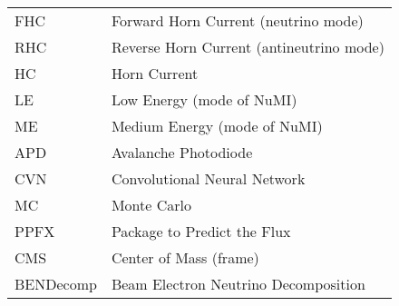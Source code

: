 \documentclass[12pt,a4paper]{report}
\let\openright=\clearpage
\begin{document}
\begin{table}[H]
\begin{tabular}{ll}
FHC        & Forward Horn Current (neutrino mode)              \\
RHC        & Reverse Horn Current (antineutrino mode)          \\
HC         & Horn Current                                      \\
LE         & Low Energy (mode of NuMI)                         \\
ME         & Medium Energy (mode of NuMI)                      \\
APD        & Avalanche Photodiode                              \\
CVN        & Convolutional Neural Network                      \\
MC         & Monte Carlo                                       \\
PPFX       & Package to Predict the Flux                       \\
CMS        & Center of Mass (frame)                            \\
BENDecomp  & Beam Electron Neutrino Decomposition              
\end{tabular}
\end{table}








%



\appendix


\openright
\end{document}
